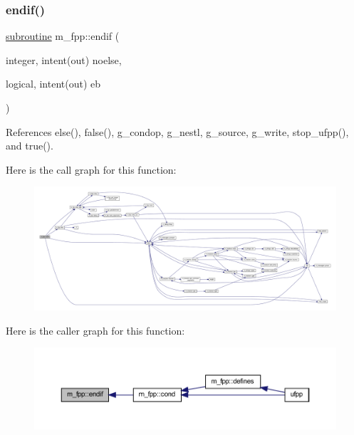 \subsubsection{\texorpdfstring{endif()}{endif()}}
{\footnotesize\ttfamily \hyperlink{M__stopwatch_83_8txt_acfbcff50169d691ff02d4a123ed70482}{subroutine} m\+\_\+fpp\+::endif (\begin{DoxyParamCaption}\item[{integer, intent(out)}]{noelse,  }\item[{logical, intent(out)}]{eb }\end{DoxyParamCaption})}



References else(), false(), g\+\_\+condop, g\+\_\+nestl, g\+\_\+source, g\+\_\+write, stop\+\_\+ufpp(), and true().

Here is the call graph for this function\+:
\nopagebreak
\begin{figure}[H]
\begin{center}
\leavevmode
\includegraphics[width=350pt]{namespacem__fpp_a943f646c7373dc0d88d4e6fe905fd90f_cgraph}
\end{center}
\end{figure}
Here is the caller graph for this function\+:
\nopagebreak
\begin{figure}[H]
\begin{center}
\leavevmode
\includegraphics[width=350pt]{namespacem__fpp_a943f646c7373dc0d88d4e6fe905fd90f_icgraph}
\end{center}
\end{figure}
\mbox{\label{namespacem__fpp_a7f223128c476778fa0334675c1431371}} 

